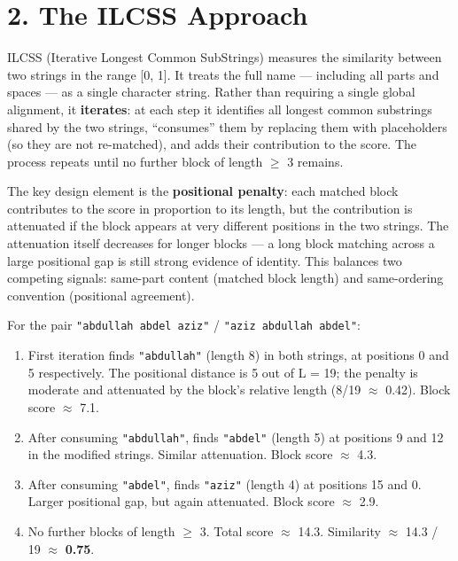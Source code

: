 \documentclass[
  11pt,
]{article}
\providecommand{\tightlist}{%
  \setlength{\itemsep}{0pt}\setlength{\parskip}{0pt}}
\begin{document}
\section{2. The ILCSS Approach}\label{the-ilcss-approach}

ILCSS (Iterative Longest Common SubStrings) measures the similarity
between two strings in the range {[}0, 1{]}. It treats the full name ---
including all parts and spaces --- as a single character string. Rather
than requiring a single global alignment, it \textbf{iterates}: at each
step it identifies all longest common substrings shared by the two
strings, ``consumes'' them by replacing them with placeholders (so they
are not re-matched), and adds their contribution to the score. The
process repeats until no further block of length $\geq$ 3 remains.

The key design element is the \textbf{positional penalty}: each matched
block contributes to the score in proportion to its length, but the
contribution is attenuated if the block appears at very different
positions in the two strings. The attenuation itself decreases for
longer blocks --- a long block matching across a large positional gap is
still strong evidence of identity. This balances two competing signals:
same-part content (matched block length) and same-ordering convention
(positional agreement).

For the pair \texttt{"abdullah\ abdel\ aziz"} /
\texttt{"aziz\ abdullah\ abdel"}:

\begin{enumerate}
\def\labelenumi{\arabic{enumi}.}
\tightlist
\item
  First iteration finds \texttt{"abdullah"} (length 8) in both strings,
  at positions 0 and 5 respectively. The positional distance is 5 out of
  L = 19; the penalty is moderate and attenuated by the block's relative
  length (8/19 $\approx$ 0.42). Block score $\approx$ 7.1.
\item
  After consuming \texttt{"abdullah"}, finds \texttt{"abdel"} (length 5)
  at positions 9 and 12 in the modified strings. Similar attenuation.
  Block score $\approx$ 4.3.
\item
  After consuming \texttt{"abdel"}, finds \texttt{"aziz"} (length 4) at
  positions 15 and 0. Larger positional gap, but again attenuated. Block
  score $\approx$ 2.9.
\item
  No further blocks of length $\geq$ 3. Total score $\approx$ 14.3. Similarity $\approx$ 14.3
  / 19 $\approx$ \textbf{0.75}.
\end{enumerate}
\end{document}
